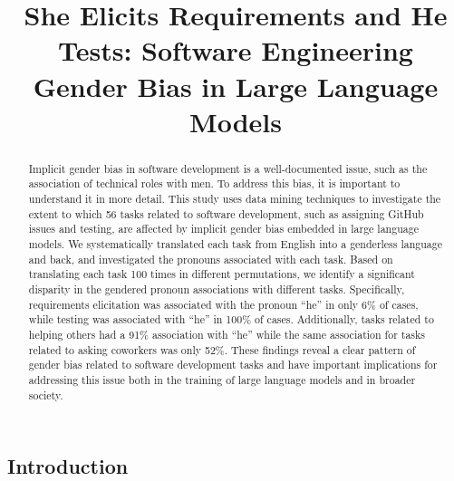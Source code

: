 \documentclass[10pt,conference]{IEEEtran}
\begin{document}
\begin{sloppy}

\title{She Elicits Requirements and He Tests: Software Engineering Gender Bias in Large Language Models}

\author{
\and
{}
}

\maketitle

\begin{abstract}

Implicit gender bias in software development is a well-documented issue, such as the association of technical roles with men. To address this bias, it is important to understand it in more detail. This study uses data mining techniques to investigate the extent to which 56 tasks related to software development, such as assigning GitHub issues and testing, are affected by implicit gender bias embedded in large language models. We systematically translated each task from English into a genderless language and back, and investigated the pronouns associated with each task. Based on translating each task 100 times in different permutations, we identify a significant disparity in the gendered pronoun associations with different tasks. Specifically, requirements elicitation was associated with the pronoun ``he'' in only 6\% of cases, while testing was associated with ``he'' in 100\% of cases. Additionally, tasks related to helping others had a 91\% association with ``he'' while the same association for tasks related to asking coworkers was only 52\%. These findings reveal a clear pattern of gender bias related to software development tasks and have important implications for addressing this issue both in the training of large language models and in broader society.

\end{abstract}

\section{Introduction}


\end{sloppy}
\end{document}
